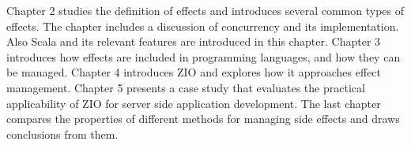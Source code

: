 Chapter 2 studies the definition of effects and introduces several common types of effects. The chapter includes a discussion of concurrency and its implementation. Also Scala and its relevant features are introduced in this chapter. Chapter 3 introduces how effects are included in programming languages, and how they can be managed. Chapter 4 introduces ZIO and explores how it approaches effect management. Chapter 5 presents a case study that evaluates the practical applicability of ZIO for server side application development. The last chapter compares the properties of different methods for managing side effects and draws conclusions from them.

